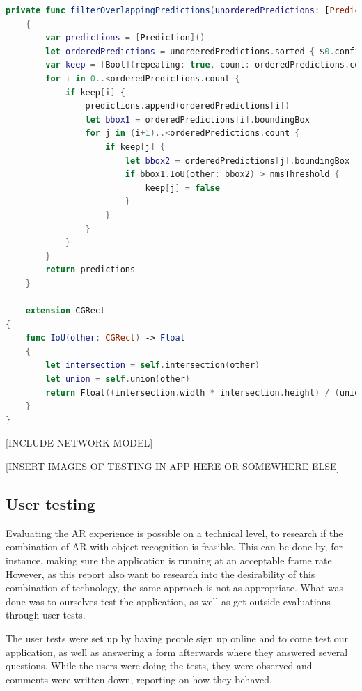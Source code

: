 \begin{lstlisting}[language=swift]
    private func filterOverlappingPredictions(unorderedPredictions: [Prediction], nmsThreshold: Float) -> [Prediction]
    {
        var predictions = [Prediction]()
        let orderedPredictions = unorderedPredictions.sorted { $0.confidence > $1.confidence }
        var keep = [Bool](repeating: true, count: orderedPredictions.count)
        for i in 0..<orderedPredictions.count {
            if keep[i] {
                predictions.append(orderedPredictions[i])
                let bbox1 = orderedPredictions[i].boundingBox
                for j in (i+1)..<orderedPredictions.count {
                    if keep[j] {
                        let bbox2 = orderedPredictions[j].boundingBox
                        if bbox1.IoU(other: bbox2) > nmsThreshold {
                            keep[j] = false
                        }
                    }
                }
            }
        }
        return predictions
    }
    
    extension CGRect
{
    func IoU(other: CGRect) -> Float
    {
        let intersection = self.intersection(other)
        let union = self.union(other)
        return Float((intersection.width * intersection.height) / (union.width * union.height))
    }
}
\end{lstlisting}



[INCLUDE NETWORK MODEL]

 [INSERT IMAGES OF TESTING IN APP HERE  OR SOMEWHERE ELSE] 

\subsection{User testing}
Evaluating the AR experience is possible on a technical level, to research if the
 combination of AR with object recognition is feasible. This can be done by, for instance, 
 making sure the application is running at an acceptable frame rate. However, as this
  report also want to research into the desirability of this combination of technology, the
  same approach is not as appropriate. What was done was to ourselves test the
   application, as well as get outside evaluations through user tests.

The user tests were set up by having people sign up online and to come test our
 application, as well as answering a form afterwards where they answered several
  questions. While the users were doing the tests, they were observed and comments were
   written down, reporting on how they behaved. 

